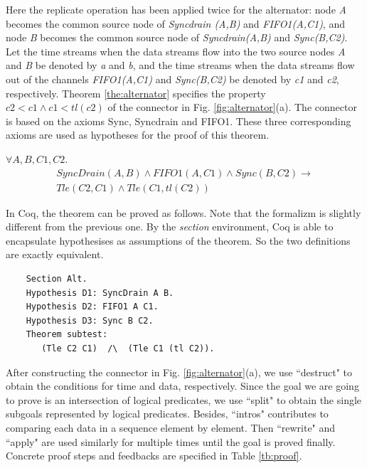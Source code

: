 \documentclass{llncs}
\begin{document}
\begin{example}
Here the replicate operation has been applied twice for the alternator: node \emph{A} becomes the common source node of \emph{Syncdrain (A,B)} and \emph{FIFO1(A,C1)}, and node \emph{B} becomes the common source node of \emph{Syncdrain(A,B)} and \emph{Sync(B,C2)}. Let the time streams when the
data streams flow into the two source nodes \emph{A} and \emph{B} be denoted by \emph{a} and \emph{b}, and the time streams when the data streams
flow out of the channels \emph{FIFO1(A,C1)} and \emph{Sync(B,C2)} be denoted by \emph{c1} and \emph{c2}, respectively. Theorem \ref{the:alternator}
specifies the property $c2<c1 \wedge c1<tl (c2)$ of the connector in Fig. \ref{fig:alternator}(a). The connector is based on the axioms
Sync, Syncdrain and FIFO1. These three corresponding axioms are used as hypotheses for the proof of this theorem.
\begin{theorem}[subtest]\label{the:alternator}
$\forall A,B,C1,C2.$
\begin{eqnarray*}
  & SyncDrain(A,B)\land FIFO1(A,C1)\land Sync(B,C2)  \rightarrow & \\
  & Tle(C2,C1) \wedge Tle(C1, tl(C2))
\end{eqnarray*}
\end{theorem}
In Coq, the theorem can be proved as follows. Note that the formalizm is slightly different from the previous one. By the \emph{section} environment, Coq is able to encapsulate hypothesises as assumptions of the theorem. So the two definitions are exactly equivalent.

\begin{verbatim}
    Section Alt.
    Hypothesis D1: SyncDrain A B.
    Hypothesis D2: FIFO1 A C1.
    Hypothesis D3: Sync B C2.
    Theorem subtest:
       (Tle C2 C1)  /\  (Tle C1 (tl C2)).
\end{verbatim}

After constructing the connector in Fig. \ref{fig:alternator}(a), we use ``destruct" to obtain the conditions for time and data, respectively.
Since the goal we are going to prove is an intersection of logical predicates, we use ``split" to obtain the single subgoals represented by
logical predicates. Besides, ``intros" contributes to comparing each data in a sequence element by element. Then ``rewrite" and ``apply" are
used similarly for multiple times until the goal is proved finally. %
Concrete proof steps and feedbacks are specified in Table \ref{tb:proof}.


\end{example}
\end{document}
